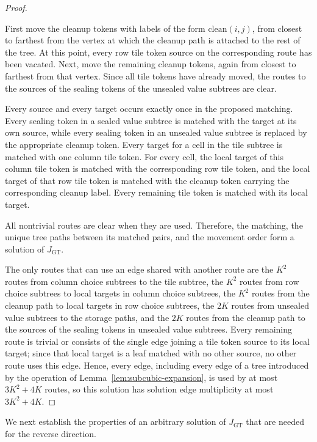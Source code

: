 \documentclass[a4paper,USenglish,thm-restate]{lipics-v2021}
\theoremstyle{problemstyle}
\begin{document}
\begin{proof}
\begin{enumerate}
First move the cleanup tokens with labels of the form $\mathrm{clean}(i,j)$, from closest to farthest from the vertex at which the cleanup path is attached to the rest of the tree. At this point, every row tile token source on the corresponding route has been vacated. Next, move the remaining cleanup tokens, again from closest to farthest from that vertex. Since all tile tokens have already moved, the routes to the sources of the sealing tokens of the unsealed value subtrees are clear.
\end{enumerate}

Every source and every target occurs exactly once in the proposed matching. Every sealing token in a sealed value subtree is matched with the target at its own source, while every sealing token in an unsealed value subtree is replaced by the appropriate cleanup token. Every target for a cell in the tile subtree is matched with one column tile token. For every cell, the local target of this column tile token is matched with the corresponding row tile token, and the local target of that row tile token is matched with the cleanup token carrying the corresponding cleanup label. Every remaining tile token is matched with its local target.

All nontrivial routes are clear when they are used. Therefore, the matching, the unique tree paths between its matched pairs, and the movement order form a solution of $J_{\mathrm{GT}}$.

The only routes that can use an edge shared with another route are the $K^2$ routes from column choice subtrees to the tile subtree, the $K^2$ routes from row choice subtrees to local targets in column choice subtrees, the $K^2$ routes from the cleanup path to local targets in row choice subtrees, the $2K$ routes from unsealed value subtrees to the storage paths, and the $2K$ routes from the cleanup path to the sources of the sealing tokens in unsealed value subtrees. Every remaining route is trivial or consists of the single edge joining a tile token source to its local target; since that local target is a leaf matched with no other source, no other route uses this edge. Hence, every edge, including every edge of a tree introduced by the operation of Lemma~\ref{lem:subcubic-expansion}, is used by at most $3K^2+4K$ routes, so this solution has solution edge multiplicity at most $3K^2+4K$.
\end{proof}

We next establish the properties of an arbitrary solution of $J_{\mathrm{GT}}$ that are needed for the reverse direction.
\end{document}
